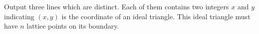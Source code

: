 Output three lines which are distinct.
Each of them contains two integers $x$ and $y$ indicating $(x,y)$ is the coordinate of an ideal triangle.
This ideal triangle must have $n$ lattice points on its boundary.
